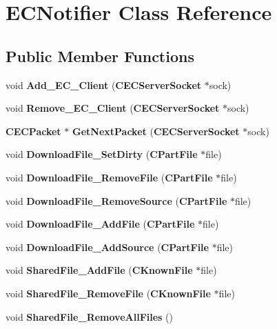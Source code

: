 \section{ECNotifier Class Reference}
\label{classECNotifier}
\subsection*{Public Member Functions}
\begin{DoxyCompactItemize}
\item 
void {\bfseries Add\_\-EC\_\-Client} ({\bf CECServerSocket} $\ast$sock)\label{classECNotifier_abfeb1082918beef7032f1f4d7d87d24e}

\item 
void {\bfseries Remove\_\-EC\_\-Client} ({\bf CECServerSocket} $\ast$sock)\label{classECNotifier_aff6f29f38fd330a0f4a4735f850feb06}

\item 
{\bf CECPacket} $\ast$ {\bfseries GetNextPacket} ({\bf CECServerSocket} $\ast$sock)\label{classECNotifier_a85a36cf8d3406e1e009d55b103c4f4c5}

\item 
void {\bfseries DownloadFile\_\-SetDirty} ({\bf CPartFile} $\ast$file)\label{classECNotifier_af70b416aea9caf2819b74e46ce061e21}

\item 
void {\bfseries DownloadFile\_\-RemoveFile} ({\bf CPartFile} $\ast$file)\label{classECNotifier_a83b26e5da3fff686a8b9e586fbfc7e7e}

\item 
void {\bfseries DownloadFile\_\-RemoveSource} ({\bf CPartFile} $\ast$file)\label{classECNotifier_aebc3718975e53c99c829ece33b3ef3e4}

\item 
void {\bfseries DownloadFile\_\-AddFile} ({\bf CPartFile} $\ast$file)\label{classECNotifier_a3fbedb4b7aef73b94055dcea3085987f}

\item 
void {\bfseries DownloadFile\_\-AddSource} ({\bf CPartFile} $\ast$file)\label{classECNotifier_afa8ca4272206d945fd9cda1be073af90}

\item 
void {\bfseries SharedFile\_\-AddFile} ({\bf CKnownFile} $\ast$file)\label{classECNotifier_aed94e651b44090ef1e0a107ec022ee88}

\item 
void {\bfseries SharedFile\_\-RemoveFile} ({\bf CKnownFile} $\ast$file)\label{classECNotifier_a5fff17ce7c89336fb6d0171b9cfd1119}

\item 
void {\bfseries SharedFile\_\-RemoveAllFiles} ()\label{classECNotifier_a350a8021abdd9f8edbe1bdff5ed54902}

\end{DoxyCompactItemize}
